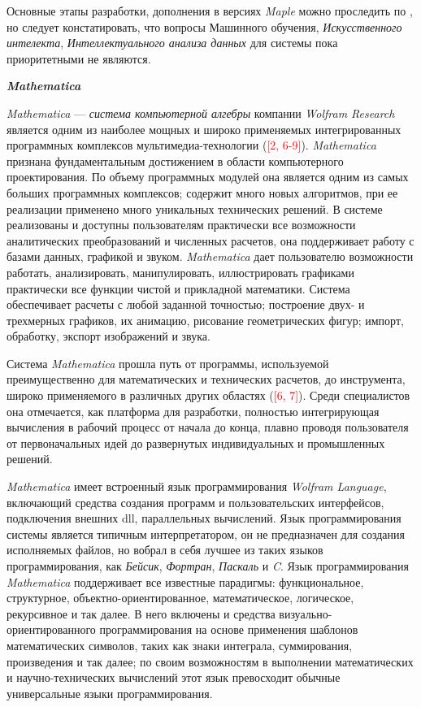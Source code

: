 Основные этапы разработки, дополнения в версиях \textit{Maple} можно проследить по , но следует констатировать, что вопросы \textit{}Машинного обучения, \textit{Искусственного интелекта}, \textit{Интеллектуального анализа данных} для системы пока приоритетными не являются.

\textbf{\textit{Mathematica}}

\textit{Mathematica} --- \textit{система компьютерной алгебры} компании \textit{Wolfram Research} является одним из наиболее мощных и широко применяемых интегрированных программных комплексов мультимедиа-технологии (\textcolor{red}{[2, 6-9]}). \textit{Mathematica} признана фундаментальным достижением в области компьютерного проектирования. По объему программных модулей она является одним из самых больших программных комплексов; содержит много новых алгоритмов, при ее реализации применено много уникальных технических решений. В системе реализованы и доступны пользователям практически все возможности аналитических преобразований и численных расчетов, она поддерживает работу с базами данных, графикой и звуком. \textit{Mathematica} дает пользователю возможности работать, анализировать, манипулировать, иллюстрировать графиками практически все функции чистой и прикладной математики. Система обеспечивает расчеты с любой заданной точностью; построение двух- и трехмерных графиков, их анимацию, рисование геометрических фигур; импорт, обработку, экспорт изображений и звука.

Система \textit{Mathematica} прошла путь от программы, используемой преимущественно для математических и технических расчетов, до инструмента, широко применяемого в различных других областях (\textcolor{red}{[6, 7]}). Среди специалистов она отмечается, как платформа для разработки, полностью интегрирующая вычисления в рабочий процесс от начала до конца, плавно проводя пользователя от первоначальных идей до развернутых индивидуальных и промышленных решений.

\textit{Mathematica} имеет встроенный язык программирования \textit{Wolfram Language}, включающий средства создания программ и пользовательских интерфейсов, подключения внешних dll, параллельных вычислений. Язык программирования системы является типичным интерпретатором, он не предназначен для создания исполняемых файлов, но вобрал в себя лучшее из таких языков программирования, как \textit{Бейсик}, \textit{Фортран}, \textit{Паскаль} и \textit{C}. Язык программирования \textit{Mathematica} поддерживает все известные парадигмы: функциональное, структурное, объектно-ориентированное, математическое, логическое, рекурсивное и так далее. В него включены и средства визуально-ориентированного программирования на основе применения шаблонов математических символов, таких как знаки интеграла, суммирования, произведения и так далее; по своим возможностям в выполнении математических и научно-технических вычислений этот язык превосходит обычные универсальные языки программирования.


